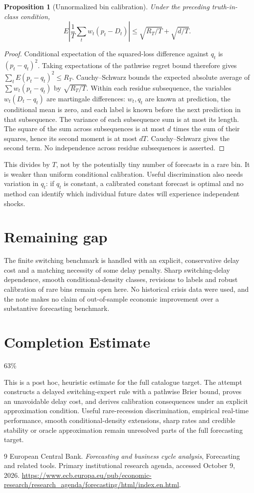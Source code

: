 \documentclass[11pt]{article}
\newtheorem{proposition}[theorem]{Proposition}
\theoremstyle{remark}
\begin{document}
\begin{proposition}[Unnormalized bin calibration]
Under the preceding truth-in-class condition,
\[
 E\left|\frac1T\sum_tw_t(p_t-D_t)\right|
 \le\sqrt{R_T/T}+\sqrt{d/T}.
\]
\end{proposition}
\begin{proof}
Conditional expectation of the squared-loss difference against $q_t$ is $(p_t-q_t)^2$. Taking expectations of the pathwise regret bound therefore gives $\sum_tE(p_t-q_t)^2\le R_T$. Cauchy--Schwarz bounds the expected absolute average of $\sum w_t(p_t-q_t)$ by $\sqrt{R_T/T}$.
Within each residue subsequence, the variables $w_t(D_t-q_t)$ are martingale differences: $w_t,q_t$ are known at prediction, the conditional mean is zero, and each label is known before the next prediction in that subsequence. The variance of each subsequence sum is at most its length. The square of the sum across subsequences is at most $d$ times the sum of their squares, hence its second moment is at most $dT$. Cauchy--Schwarz gives the second term. No independence across residue subsequences is asserted.
\end{proof}
This divides by $T$, not by the potentially tiny number of forecasts in a rare bin. It is weaker than uniform conditional calibration. Useful discrimination also needs variation in $q_t$: if $q_t$ is constant, a calibrated constant forecast is optimal and no method can identify which individual future dates will experience independent shocks.

\section*{Remaining gap}
The finite switching benchmark is handled with an explicit, conservative delay cost and a matching necessity of some delay penalty. Sharp switching-delay dependence, smooth conditional-density classes, revisions to labels and robust calibration of rare bins remain open here. No historical crisis data were used, and the note makes no claim of out-of-sample economic improvement over a substantive forecasting benchmark.

\section{Completion Estimate}
63\%

This is a post hoc, heuristic estimate for the full catalogue target.
The attempt constructs a delayed switching-expert rule with a pathwise Brier bound, proves an unavoidable delay cost, and derives calibration consequences under an explicit approximation condition. Useful rare-recession discrimination, empirical real-time performance, smooth conditional-density extensions, sharp rates and credible stability or oracle approximation remain unresolved parts of the full forecasting target.

\begin{thebibliography}{9}
 European Central Bank. \emph{Forecasting and business cycle analysis}, Forecasting and related tools. Primary institutional research agenda, accessed October 9, 2026. \url{https://www.ecb.europa.eu/pub/economic-research/research_agenda/forecasting/html/index.en.html}.
\end{thebibliography}
\end{document}
